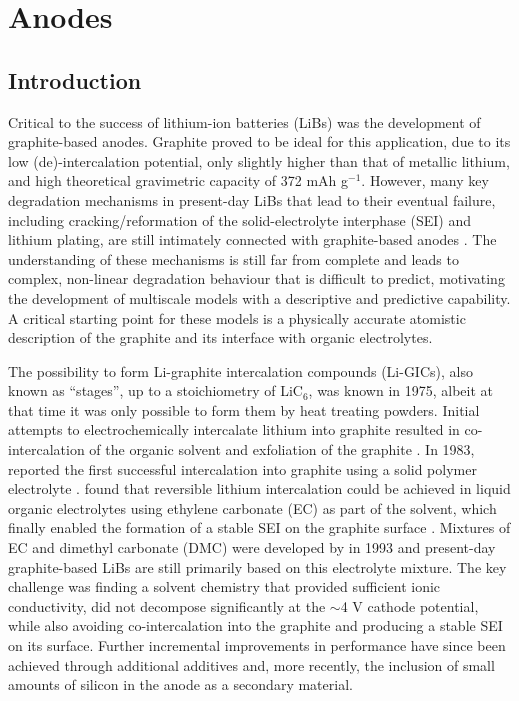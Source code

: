 \documentclass[../main.tex]{subfiles}
\begin{document}
\section{Anodes}
\label{sec:anodes}

\subsection{Introduction}
\label{sec:anodes_intro}
Critical to the success of lithium-ion batteries (LiBs) was the development of graphite-based anodes. Graphite proved to be ideal for this application, due to its low (de)-intercalation potential, only slightly higher than that of metallic lithium, and high theoretical gravimetric capacity of 372 mAh g$^{-1}$. However, many key degradation mechanisms in present-day LiBs that lead to their eventual failure, including cracking/reformation of the solid-electrolyte interphase (SEI) and lithium plating, are still intimately connected with graphite-based anodes \cite{VETTER2005269,ma6041310}. The understanding of these mechanisms is still far from complete and leads to complex, non-linear degradation behaviour that is difficult to predict,\cite{YANG201728} motivating the development of multiscale models with a descriptive and predictive capability. A critical starting point for these models is a physically accurate atomistic description of the graphite and its interface with organic electrolytes.

The possibility to form Li-graphite intercalation compounds (Li-GICs), also known as ``stages'', up to a stoichiometry of LiC$_{6}$, was known in 1975, albeit at that time it was only possible to form them by heat treating powders\cite{GUERARD1975337,Woo1983,BASU1979275}. Initial attempts to electrochemically intercalate lithium into graphite resulted in co-intercalation of the organic solvent and exfoliation of the graphite \cite{besenhard1976electrochemical}. In 1983, \citeauthor{yazami1983} reported the first successful intercalation into graphite using a solid polymer electrolyte \cite{yazami1983}. \citeauthor{Fong1990} found that reversible lithium intercalation could be achieved in liquid organic electrolytes using ethylene carbonate (EC) as part of the solvent, which finally enabled the formation of a stable SEI on the graphite surface \cite{Fong1990}. Mixtures of EC and dimethyl carbonate (DMC) were developed by \citeauthor{TARASCON19931221} in 1993 \cite{TARASCON19931221} and present-day graphite-based LiBs are still primarily based on this electrolyte mixture. The key challenge was finding a solvent chemistry that provided sufficient ionic conductivity, did not decompose significantly at the $\sim$4 V cathode potential, while also avoiding co-intercalation into the graphite and producing a stable SEI on its surface. Further incremental improvements in performance have since been achieved through additional additives and, more recently, the inclusion of small amounts of silicon in the anode as a secondary material. 
\end{document}
